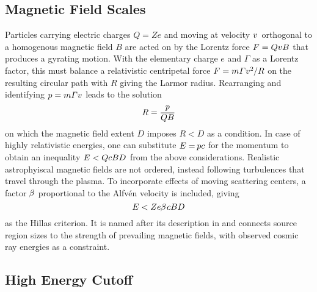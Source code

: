 \subsection{Magnetic Field Scales}
\label{sub:fields}

Particles carrying electric charges $Q = Ze$ and moving at velocity $v \kern+1.0pt$ orthogonal to a homogenous magnetic field $B$ are
acted on by the Lorentz force $F = QvB \kern+0.5pt$ that produces a gyrating motion. With the elementary charge $e$ and $\varGamma$
as a Lorentz factor, this must balance a relativistic centripetal force $F = m \varGamma v^2 \kern-0.5pt / R$ on the resulting circular
path with $R$ giving the Larmor radius. Rearranging and identifying $p = m \varGamma v \kern+0.5pt$ leads to the solution
\begin{equation*}
	R = \frac{p}{\raisebox{0.3ex}{$QB \kern+0.3pt$}}
\end{equation*}
on which the magnetic field extent $D$ imposes $R < D$ as a condition. In case of highly relativistic energies, one can substitute
$E = \kern-0.8pt pc$ for the momentum to obtain an inequality $E < QcBD \kern+0.5pt$ from the above considerations. Realistic astrophyiscal
magnetic fields are not ordered, instead following turbulences that travel through the plasma. To incorporate effects of moving scattering
centers, a factor $\kern-0.5pt \beta \kern+0.5pt$ proportional to the Alfvén velocity is included, giving
\begin{equation}
	E < Ze \kern-0.3pt \beta \kern+0.9pt cBD
	\label{eqn:hillas}
\end{equation}
as the Hillas criterion. It is named after its description in \cite{Hillas_1984} and connects source region sizes to the strength of
prevailing magnetic fields, with observed cosmic ray energies as a constraint.



\subsection{High Energy Cutoff}
\label{sub:cutoff}

